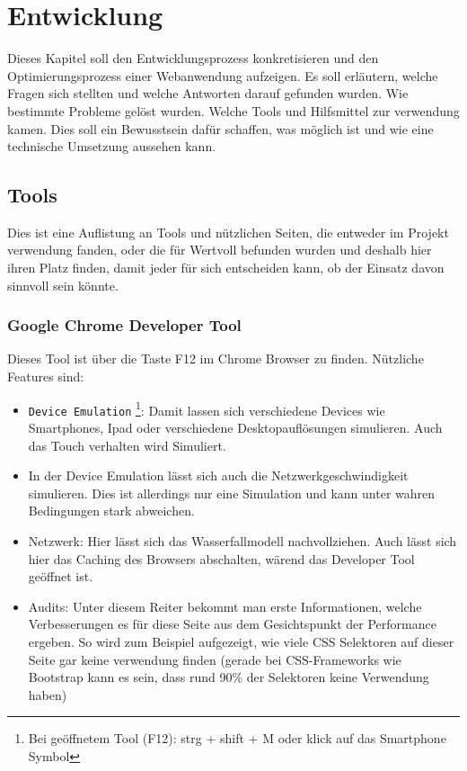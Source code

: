 \section{Entwicklung} %
\label{sec:entwicklung}
	Dieses Kapitel soll den Entwicklungsprozess konkretisieren und den Optimierungsprozess einer Webanwendung aufzeigen. Es soll erläutern, welche Fragen sich stellten und welche Antworten darauf gefunden wurden. Wie bestimmte Probleme gelöst wurden. Welche Tools und Hilfsmittel zur verwendung kamen. Dies soll ein Bewusstsein dafür schaffen, was möglich ist und wie eine technische Umsetzung aussehen kann. 
	
	\subsection{Tools}
	\label{sub:tools}
		Dies ist eine Auflistung an Tools und nützlichen Seiten, die entweder im Projekt verwendung fanden, oder die für Wertvoll befunden wurden und deshalb hier ihren Platz finden, damit jeder für sich entscheiden kann, ob der Einsatz davon sinnvoll sein könnte.

		\subsubsection{Google Chrome Developer Tool} %
		\label{ssub:google_chrome_developertool}
			Dieses Tool ist über die Taste F12 im Chrome Browser zu finden. Nützliche Features sind: 

			\begin{itemize}
				\item \texttt{Device Emulation} \footnote{Bei geöffnetem Tool (F12): strg + shift + M oder klick auf das Smartphone Symbol}: Damit lassen sich verschiedene Devices wie Smartphones, Ipad oder verschiedene Desktopauflösungen simulieren. Auch das Touch verhalten wird Simuliert.
				\item In der Device Emulation lässt sich auch die Netzwerkgeschwindigkeit simulieren. Dies ist allerdings nur eine Simulation und kann unter wahren Bedingungen stark abweichen.
				\item Netzwerk: Hier lässt sich das Wasserfallmodell nachvollziehen. Auch lässt sich hier das Caching des Browsers abschalten, wärend das Developer Tool geöffnet ist.
				\item Audits: Unter diesem Reiter bekommt man erste Informationen, welche Verbesserungen es für diese Seite aus dem Gesichtspunkt der Performance ergeben. So wird zum Beispiel aufgezeigt, wie viele CSS Selektoren auf dieser Seite gar keine verwendung finden (gerade bei CSS-Frameworks wie Bootstrap kann es sein, dass rund 90\% der Selektoren keine Verwendung haben)
			\end{itemize}

